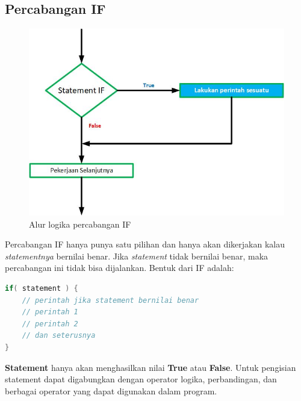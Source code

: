 \subsection{Percabangan IF}
\begin{figure}[h!]
    \centering
    \includegraphics[scale=0.4]{pictures/flowmap_if.jpg}
    \caption{Alur logika percabangan IF}
    \label{}
\end{figure}
Percabangan IF hanya punya satu pilihan dan hanya akan dikerjakan kalau \textit{statementnya} bernilai benar. Jika \textit{statement} tidak bernilai benar, maka percabangan ini tidak bisa dijalankan. Bentuk dari IF adalah:
\begin{lstlisting}[language=Java]
if( statement ) {
    // perintah jika statement bernilai benar
    // perintah 1
    // perintah 2
    // dan seterusnya
}    
\end{lstlisting}

\textbf{Statement} hanya akan menghasilkan nilai \textbf{True} atau \textbf{False}. Untuk pengisian statement dapat digabungkan dengan operator logika, perbandingan, dan berbagai operator yang dapat digunakan dalam program. 

\medskip

\noindent{}

\medskip

